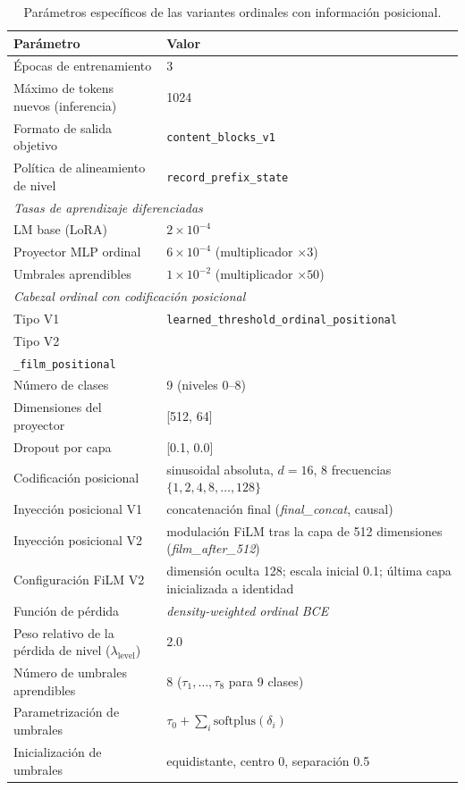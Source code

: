 \begin{table}[htbp]
\centering
\caption{Parámetros específicos de las variantes ordinales con información posicional.}
\label{tab:AnexoA_ordinal}
\begin{tabularx}{\textwidth}{p{}X}
\toprule
\textbf{Parámetro} & \textbf{Valor} \\
\midrule
Épocas de entrenamiento & 3 \\
Máximo de tokens nuevos (inferencia) & 1024 \\
Formato de salida objetivo & \texttt{content\_blocks\_v1} \\
Política de alineamiento de nivel & \texttt{record\_prefix\_state} \\
\midrule
\multicolumn{2}{l}{\textit{Tasas de aprendizaje diferenciadas}} \\
LM base (LoRA) & $2 \times 10^{-4}$ \\
Proyector MLP ordinal & $6 \times 10^{-4}$ (multiplicador $\times 3$) \\
Umbrales aprendibles & $1 \times 10^{-2}$ (multiplicador $\times 50$) \\
\midrule
\multicolumn{2}{l}{\textit{Cabezal ordinal con codificación posicional}} \\
Tipo V1 & \texttt{learned\_threshold\_ordinal\_positional} \\
Tipo V2 & \shortstack[l]{\texttt{learned\_threshold\_ordinal}\\\texttt{\_film\_positional}} \\
Número de clases & 9 (niveles 0--8) \\
Dimensiones del proyector & [512, 64] \\
Dropout por capa & [0.1, 0.0] \\
Codificación posicional & sinusoidal absoluta, $d=16$, 8 frecuencias $\{1, 2, 4, 8, \ldots, 128\}$ \\
Inyección posicional V1 & concatenación final (\textit{final\_concat}, causal) \\
Inyección posicional V2 & modulación FiLM tras la capa de 512 dimensiones (\textit{film\_after\_512}) \\
Configuración FiLM V2 & dimensión oculta 128; escala inicial 0.1; última capa inicializada a identidad \\
Función de pérdida & \textit{density-weighted ordinal BCE} \\
Peso relativo de la pérdida de nivel ($\lambda_\text{level}$) & 2.0 \\
Número de umbrales aprendibles & 8 ($\tau_1, \ldots, \tau_8$ para 9 clases) \\
Parametrización de umbrales & $\tau_0 + \sum_{i} \text{softplus}(\delta_i)$ \\
Inicialización de umbrales & equidistante, centro 0, separación 0.5 \\
\bottomrule
\end{tabularx}
\end{table}


